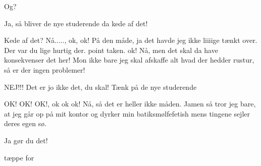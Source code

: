 \documentclass[danish]{article}
\begin{document}
\begin{sketch}
 Og?

 Ja, så bliver de nye studerende da kede af det!

 Kede af det? Nå....., ok, ok! På den måde, ja det havde jeg ikke liiiige
tænkt over. Der var du lige hurtig der. point taken. ok!  Nå, men det
skal da have konsekvenser det her! Mon ikke bare jeg skal afskaffe alt
hvad der hedder rustur, så er der ingen problemer!

 NEJ!!! Det er jo ikke det, du skal! Tænk på de nye studerende

 OK! OK! OK!, ok ok ok! Nå, så det er heller ikke måden. Jamen så
tror jeg bare, at jeg går op på mit kontor og dyrker min
batiksmølfefetish mens tingene sejler deres egen sø.

 Ja gør du det!

\scene tæppe for


\end{sketch}
\end{document}
